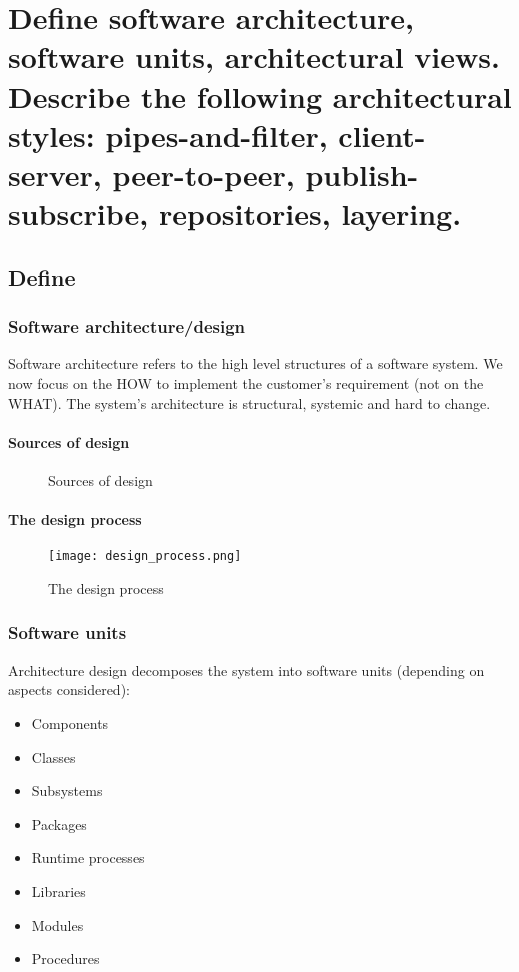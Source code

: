 \clearpage{}
\section{Define software architecture, software units, architectural views.
Describe the following architectural styles: pipes-and-filter,
client-server, peer-to-peer, publish-subscribe, repositories, layering.}

\subsection{Define}

\subsubsection{Software architecture/design}

Software architecture refers to the high level structures of a software
system. We now focus on the HOW to implement the customer's requirement
(not on the WHAT). The system's architecture is structural, systemic and
hard to change.

\paragraph{Sources of design}

\begin{figure}[!ht]
    \centering
    
    \caption{Sources of design}
\end{figure}

\paragraph{The design process}

\begin{figure}[!ht]
    \centering
    \texttt{[image: design\_process.png]}
    \caption{The design process}
\end{figure}


\subsubsection{Software units}

Architecture design decomposes the system into software units (depending on
aspects considered):

\begin{itemize}
    \item Components
    \item Classes
    \item Subsystems
    \item Packages
    \item Runtime processes
    \item Libraries
    \item Modules
    \item Procedures
\end{itemize}


